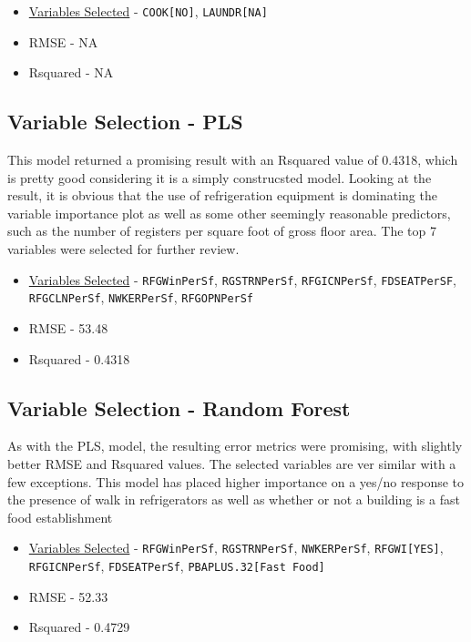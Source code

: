 \begin{itemize}
\item \hyperref[appendix:electricity:pca]{Variables Selected} - \lstinline{COOK[NO]}, \lstinline{LAUNDR[NA]}
\item RMSE - NA
\item Rsquared - NA
\end{itemize}

\subsection{Variable Selection - PLS}

This model returned a promising result with an Rsquared value of 0.4318, which is pretty good considering it is a simply construcsted model.  Looking at the result, it is obvious that the use of refrigeration equipment is dominating the variable importance plot as well as some other seemingly reasonable predictors, such as the number of registers per square foot of gross floor area.  The top 7 variables were selected for further review.

\begin{itemize}
\item \hyperref[appendix:electricity:pls]{Variables Selected} - \lstinline{RFGWinPerSf}, \lstinline{RGSTRNPerSf}, \lstinline{RFGICNPerSf}, \lstinline{FDSEATPerSF}, \lstinline{RFGCLNPerSf}, \lstinline{NWKERPerSf}, \lstinline{RFGOPNPerSf}
\item RMSE - 53.48
\item Rsquared - 0.4318
\end{itemize}

\subsection{Variable Selection - Random Forest}

As with the PLS, model, the resulting error metrics were promising, with slightly better RMSE and Rsquared values.  The selected variables are ver similar with a few exceptions.  This model has placed higher importance on a yes/no response to the presence of walk in refrigerators as well as whether or not a building is a fast food establishment

\begin{itemize}
\item \hyperref[appendix:electricity:rf]{Variables Selected} - \lstinline{RFGWinPerSf}, \lstinline{RGSTRNPerSf}, \lstinline{NWKERPerSf}, \lstinline{RFGWI[YES]}, \lstinline{RFGICNPerSf}, \lstinline{FDSEATPerSf}, \lstinline{PBAPLUS.32[Fast Food]}
\item RMSE - 52.33
\item Rsquared - 0.4729
\end{itemize}


